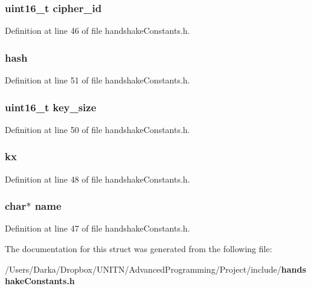 \subsubsection[{cipher\+\_\+id}]{\setlength{\rightskip}{0pt plus 5cm}uint16\+\_\+t cipher\+\_\+id}\label{structcipher__suite__t_abd7eac06ec5e8b636fe8916fff6c8dfa}


Definition at line 46 of file handshake\+Constants.\+h.

\subsubsection[{hash}]{ hash}\label{structcipher__suite__t_af348e470337f3c253a2ed303577efa8e}


Definition at line 51 of file handshake\+Constants.\+h.

\subsubsection[{key\+\_\+size}]{\setlength{\rightskip}{0pt plus 5cm}uint16\+\_\+t key\+\_\+size}\label{structcipher__suite__t_a05d0f91f98ef3fda1cbbbdc0af1c90ca}


Definition at line 50 of file handshake\+Constants.\+h.

\subsubsection[{kx}]{ kx}\label{structcipher__suite__t_ad84bfc73673c813712dbbc08d89c53a9}


Definition at line 48 of file handshake\+Constants.\+h.

\subsubsection[{name}]{\setlength{\rightskip}{0pt plus 5cm}char$\ast$ name}\label{structcipher__suite__t_a5ac083a645d964373f022d03df4849c8}


Definition at line 47 of file handshake\+Constants.\+h.



The documentation for this struct was generated from the following file\+:\begin{DoxyCompactItemize}
\item 
/\+Users/\+Darka/\+Dropbox/\+U\+N\+I\+T\+N/\+Advanced\+Programming/\+Project/include/{\bf handshake\+Constants.\+h}\end{DoxyCompactItemize}
